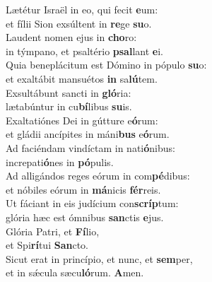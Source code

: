 \evenverse Lætétur Israël in eo, qui fecit \textbf{e}um:~\*\\
\evenverse et fílii Sion exsúltent in \textbf{re}ge \textbf{su}o.\\
\oddverse Laudent nomen ejus in \textbf{cho}ro:~\*\\
\oddverse in týmpano, et psaltério \textbf{psal}lant \textbf{e}i.\\
\evenverse Quia beneplácitum est Dómino in pópulo \textbf{su}o:~\*\\
\evenverse et exaltábit mansuétos \textbf{in} sa\textbf{lú}tem.\\
\oddverse Exsultábunt sancti in \textbf{gló}ria:~\*\\
\oddverse lætabúntur in cu\textbf{bí}libus \textbf{su}is.\\
\evenverse Exaltatiónes Dei in gútture e\textbf{ó}rum:~\*\\
\evenverse et gládii ancípites in máni\textbf{bus} e\textbf{ó}rum.\\
\oddverse Ad faciéndam vindíctam in nati\textbf{ó}nibus:~\*\\
\oddverse increpati\textbf{ó}nes in \textbf{pó}pulis.\\
\evenverse Ad alligándos reges eórum in com\textbf{pé}dibus:~\*\\
\evenverse et nóbiles eórum in \textbf{má}nicis \textbf{fér}reis.\\
\oddverse Ut fáciant in eis judícium con\textbf{scríp}tum:~\*\\
\oddverse glória hæc est ómnibus \textbf{san}ctis \textbf{e}jus.\\
\evenverse Glória Patri, et \textbf{Fí}lio,~\*\\
\evenverse et Spi\textbf{rí}tui \textbf{San}cto.\\
\oddverse Sicut erat in princípio, et nunc, et \textbf{sem}per,~\*\\
\oddverse et in sǽcula sæcu\textbf{ló}rum. \textbf{A}men.\\
